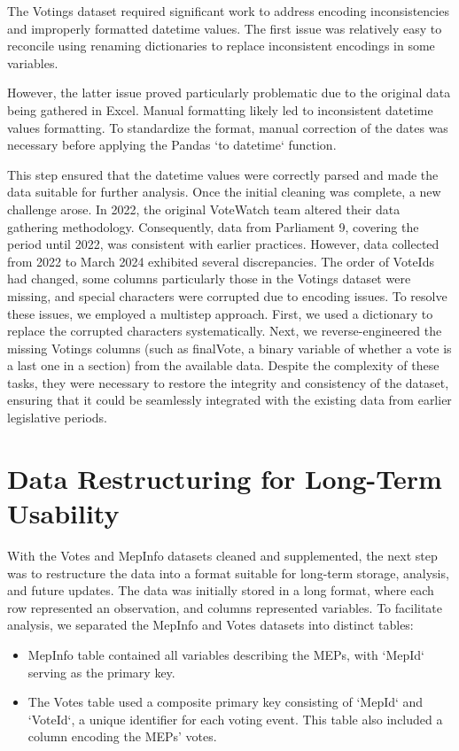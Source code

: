 \documentclass[a4paper,12pt]{report}
\begin{document}
    The Votings dataset required significant work to address encoding inconsistencies and improperly formatted
    datetime
    values.
    The first issue was relatively easy to reconcile using renaming dictionaries to replace inconsistent
    encodings in some variables.

    However, the latter issue proved particularly problematic due to the original data being gathered in Excel.
    Manual
    formatting likely led to inconsistent datetime values formatting.
    To standardize the format, manual
    correction of
    the dates was necessary before applying the Pandas `to datetime` function.

    This step ensured that the datetime values were correctly parsed and made the data suitable for further
    analysis.
    Once the initial cleaning was complete, a new challenge arose.
    In 2022, the original VoteWatch team altered
    their
    data gathering methodology.
    Consequently, data from Parliament 9, covering the period until 2022, was
    consistent
    with earlier practices.
    However, data collected from 2022 to March 2024 exhibited several discrepancies. The
    order
    of VoteIds had changed, some columns particularly those in the Votings dataset were missing, and special
    characters
    were corrupted due to encoding issues.
    To resolve these issues, we employed a multistep approach.
    First, we used a dictionary to replace the corrupted characters systematically.
    Next, we reverse-engineered the missing Votings columns (such as finalVote, a binary
    variable of whether a vote is a last one in a section) from the available data.
    Despite the complexity of these tasks,
    they were necessary to restore the integrity and consistency of the dataset, ensuring that it could
    be
    seamlessly integrated with the existing data from earlier legislative periods.


    \section{Data Restructuring for Long-Term Usability}\label{sec:data-restructuring-for-long-term-usability}

    With the Votes and MepInfo datasets cleaned and supplemented, the next step was to restructure the data into
    a
    format suitable for long-term storage, analysis, and future updates.
    The data was initially stored in a long
    format,
    where each row represented an observation, and columns represented variables.
    To facilitate analysis, we
    separated
    the MepInfo and Votes datasets into distinct tables:
    \begin{itemize}
        \item
        MepInfo table contained all variables describing the MEPs, with `MepId` serving as the primary key.
        \item
        The Votes table used a composite primary key consisting of `MepId` and `VoteId`, a unique identifier for
        each
        voting event.
        This table also included a column encoding the MEPs' votes.
    \end{itemize}
\end{document}
